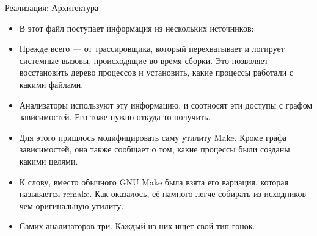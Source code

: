 \begin{frame}{Реализация: Архитектура}
{\begin{itemize}
                \item В этот файл поступает информация из нескольких источников:

                \item Прежде всего --- от трассировщика, который перехватывает и логирует системные вызовы, происходящие во время сборки. Это позволяет восстановить дерево процессов и установить, какие процессы работали с какими файлами.

                \item Анализаторы используют эту информацию, и соотносят эти доступы с графом зависимостей. Его тоже нужно откуда-то получить.

                \item Для этого пришлось модифицировать саму утилиту Make. Кроме графа зависимостей, она также сообщает о том, какие процессы были созданы какими целями.

                \item К слову, вместо обычного GNU Make была взята его вариация, которая называется remake. Как оказалось, её намного легче собирать из исходников чем оригинальную утилиту.

                \item Самих анализаторов три. Каждый из них ищет свой тип гонок.
            \end{itemize}
        }
    \end{frame}

